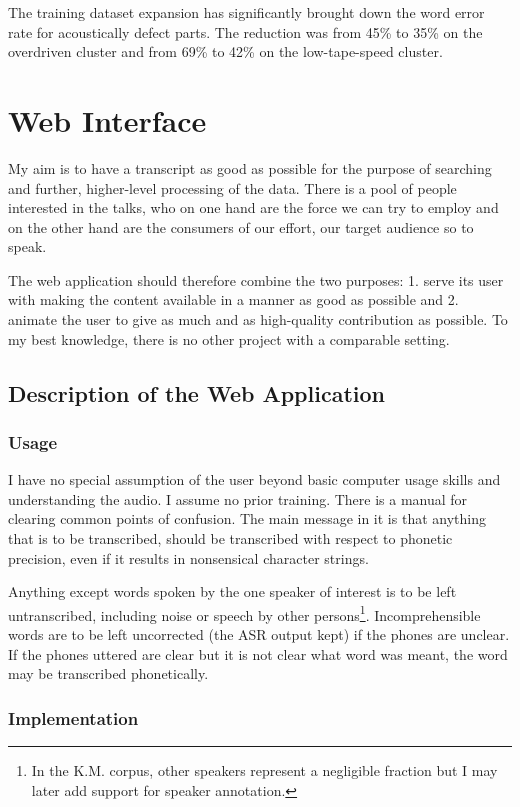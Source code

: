 \documentclass[hidelinks,12pt,a4paper]{report}
\begin{document}
The training dataset expansion has significantly brought down the word error
rate for acoustically defect parts. The reduction was from 45\% to 35\% on the
overdriven cluster and from 69\% to 42\% on the low-tape-speed cluster.

\chapter{Web Interface}

My aim is to have a transcript as good as possible for the purpose
of searching and further, higher-level processing of the data. There is a pool
of people interested in the talks, who on one hand are the force we can try to
employ and on the other hand are the consumers of our effort, our target
audience so to speak.

The web application should therefore combine the two purposes: 1. serve its user
with making the content available in a manner as good as possible and 2. animate
the user to give as much and as high-quality contribution as possible.
To my best knowledge, there is no other project with a comparable setting.

\section{Description of the Web Application}

\subsection{Usage}

I have no special assumption of the user beyond basic computer usage skills and
understanding the audio. I assume no prior training. There is a manual for
clearing common points of confusion. The main message in it is that anything
that is to be transcribed, should be transcribed with respect to
phonetic precision, even if it results in nonsensical character strings.

Anything except words spoken by the one speaker of interest is to be left
untranscribed, including noise or speech by other persons\footnote{In the K.M.
corpus,
other speakers represent a negligible fraction but I may later add support for
speaker annotation.}. Incomprehensible words are to be left uncorrected
(the ASR output kept) if the phones are unclear. If the phones uttered are clear
but it is not clear what word was meant, the word may be transcribed
phonetically.

\subsection{Implementation}
\end{document}
